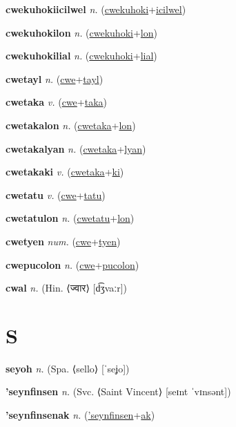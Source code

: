 \textbf{\hypertarget{cwekuhokiicilwel}{cwekuhokiicilwel}} \textit{n.} (\hyperlink{cwekuhoki}{cwekuhoki}+\allowbreak \hyperlink{icilwel}{icilwel})


\textbf{\hypertarget{cwekuhokilon}{cwekuhokilon}} \textit{n.} (\hyperlink{cwekuhoki}{cwekuhoki}+\allowbreak \hyperlink{lon}{lon})


\textbf{\hypertarget{cwekuhokilial}{cwekuhokilial}} \textit{n.} (\hyperlink{cwekuhoki}{cwekuhoki}+\allowbreak \hyperlink{lial}{lial})


\textbf{\hypertarget{cwetayl}{cwetayl}} \textit{n.} (\hyperlink{cwe}{cwe}+\allowbreak \hyperlink{tayl}{tayl})


\textbf{\hypertarget{cwetaka}{cwetaka}} \textit{v.} (\hyperlink{cwe}{cwe}+\allowbreak \hyperlink{taka}{taka})


\textbf{\hypertarget{cwetakalon}{cwetakalon}} \textit{n.} (\hyperlink{cwetaka}{cwetaka}+\allowbreak \hyperlink{lon}{lon})


\textbf{\hypertarget{cwetakalyan}{cwetakalyan}} \textit{n.} (\hyperlink{cwetaka}{cwetaka}+\allowbreak \hyperlink{lyan}{lyan})


\textbf{\hypertarget{cwetakaki}{cwetakaki}} \textit{v.} (\hyperlink{cwetaka}{cwetaka}+\allowbreak \hyperlink{ki}{ki})


\textbf{\hypertarget{cwetatu}{cwetatu}} \textit{v.} (\hyperlink{cwe}{cwe}+\allowbreak \hyperlink{tatu}{tatu})


\textbf{\hypertarget{cwetatulon}{cwetatulon}} \textit{n.} (\hyperlink{cwetatu}{cwetatu}+\allowbreak \hyperlink{lon}{lon})


\textbf{\hypertarget{cwetyen}{cwetyen}} \textit{num.} (\hyperlink{cwe}{cwe}+\allowbreak \hyperlink{tyen}{tyen})


\textbf{\hypertarget{cwepucolon}{cwepucolon}} \textit{n.} (\hyperlink{cwe}{cwe}+\allowbreak \hyperlink{pucolon}{pucolon})


\textbf{\hypertarget{cwal}{cwal}} \textit{n.} (Hin. ⟨{\devanagari{}ज्वार}⟩ [d͡ʒvaːr])


\section{S}

\textbf{\hypertarget{seyoh}{seyoh}} \textit{n.} (Spa. ⟨sello⟩ [ˈseʝo])


\textbf{\hypertarget{'seynfinsen}{'seynfinsen}} \textit{n.} (Svc. ⟨Saint Vincent⟩ [seɪnt ˈvɪnsənt])


\textbf{\hypertarget{'seynfinsenak}{'seynfinsenak}} \textit{n.} (\hyperlink{'seynfinsen}{'seynfinsen}+\allowbreak \hyperlink{ak}{ak})


